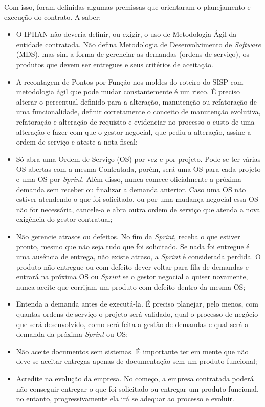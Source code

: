Com isso, foram definidas algumas premissas que orientaram o planejamento e execução do contrato. A saber: 
\begin{itemize}
\item O IPHAN não deveria definir, ou exigir, o uso de Metodologia Ágil da entidade contratada. Não defina Metodologia de Desenvolvimento de \textit{Software} (MDS), mas sim a
forma de gerenciar as demandas (ordens de serviço), os produtos que devem ser entregues e seus critérios de aceitação. 
\item A recontagem de Pontos por Função nos moldes do roteiro do SISP com metodologia ágil que pode mudar constantemente é um risco. É preciso alterar o percentual definido para a alteração, manutenção ou refatoração de uma funcionalidade, definir corretamente o conceito de manutenção evolutiva, refatoração e alteração de requisito e evidenciar no processo o custo de uma alteração e fazer com que o gestor negocial, que pediu a alteração, assine a ordem de serviço e ateste a nota fiscal;
\item Só abra uma Ordem de Serviço (OS) por vez e por projeto. Pode-se ter várias OS abertas com a mesma Contratada, porém, será uma OS para cada projeto e uma OS por \textit{Sprint}. Além disso, nunca comece oficialmente a próxima demanda sem receber ou finalizar a demanda anterior. Caso uma OS não estiver atendendo o que foi solicitado, ou por uma mudança negocial essa OS não for necessária, cancele-a e abra outra ordem de serviço que atenda a nova exigência do gestor contratual;
\item Não gerencie atrasos ou defeitos. No fim da \textit{Sprint}, receba o que estiver pronto, mesmo que não seja tudo que foi solicitado. Se nada foi entregue é uma ausência de entrega, não existe atraso, a \textit{Sprint} é considerada perdida. O produto não entregue ou com defeito dever voltar para fila de demandas e entrará na próxima OS ou \textit{Sprint} se o gestor negocial a quiser novamente, nunca aceite que corrijam um produto com defeito dentro da mesma OS;
\item Entenda a demanda antes de executá-la. É preciso planejar, pelo menos, com quantas ordens de serviço o projeto será validado, qual o processo de negócio que será desenvolvido, como será feita a gestão de demandas e qual será a demanda da próxima \textit{Sprint} ou OS;
\item Não aceite documentos sem sistemas. É importante ter em mente que não deve-se aceitar entregas apenas de documentação sem um produto funcional;
\item Acredite na evolução da empresa. No começo, a empresa contratada poderá não conseguir entregar o que foi solicitado ou entregar um produto funcional, no entanto, progressivamente ela irá se adequar ao processo e evoluir. 
\end{itemize} 

